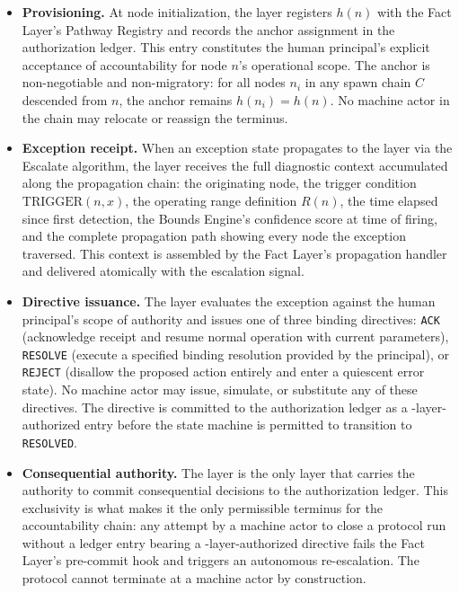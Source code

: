 \begin{itemize}\itemsep=0pt
\item[(\textit{i})] \textbf{Provisioning.} At node initialization, the \purpose{} layer registers $h(n)$ with the Fact Layer's Pathway Registry and records the anchor assignment in the authorization ledger. This entry constitutes the human principal's explicit acceptance of accountability for node $n$'s operational scope. The anchor is non-negotiable and non-migratory: for all nodes $n_i$ in any spawn chain $C$ descended from $n$, the anchor remains $h(n_i) = h(n)$. No machine actor in the chain may relocate or reassign the terminus.

\item[(\textit{ii})] \textbf{Exception receipt.} When an exception state propagates to the \purpose{} layer via the Escalate algorithm, the \purpose{} layer receives the full diagnostic context accumulated along the propagation chain: the originating node, the trigger condition $\text{TRIGGER}(n, x)$, the operating range definition $R(n)$, the time elapsed since first detection, the Bounds Engine's confidence score at time of firing, and the complete propagation path showing every node the exception traversed. This context is assembled by the Fact Layer's propagation handler and delivered atomically with the escalation signal.

\item[(\textit{iii})] \textbf{Directive issuance.} The \purpose{} layer evaluates the exception against the human principal's scope of authority and issues one of three binding directives: \texttt{ACK} (acknowledge receipt and resume normal operation with current parameters), \texttt{RESOLVE} (execute a specified binding resolution provided by the principal), or \texttt{REJECT} (disallow the proposed action entirely and enter a quiescent error state). No machine actor may issue, simulate, or substitute any of these directives. The directive is committed to the authorization ledger as a \purpose-layer-authorized entry before the state machine is permitted to transition to \texttt{RESOLVED}.

\item[(\textit{iv})] \textbf{Consequential authority.} The \purpose{} layer is the only layer that carries the authority to commit consequential decisions to the authorization ledger. This exclusivity is what makes it the only permissible terminus for the accountability chain: any attempt by a machine actor to close a protocol run without a ledger entry bearing a \purpose-layer-authorized directive fails the Fact Layer's pre-commit hook and triggers an autonomous re-escalation. The protocol cannot terminate at a machine actor by construction.
\end{itemize}

